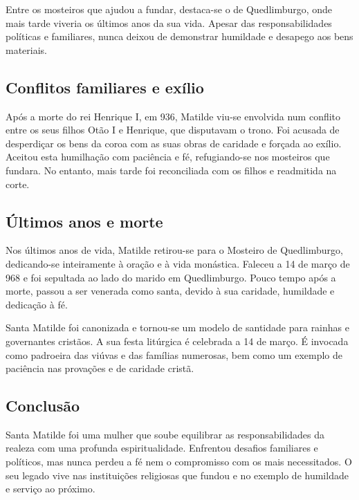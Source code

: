 \documentclass[a4paper,14pt]{extarticle} \usepackage[utf8]{inputenc}
\begin{document}
Entre os mosteiros que ajudou a fundar, destaca-se o de Quedlimburgo, onde mais tarde viveria os últimos anos da sua vida. Apesar das responsabilidades políticas e familiares, nunca deixou de demonstrar humildade e desapego aos bens materiais.

\subsection{Conflitos familiares e exílio}

Após a morte do rei Henrique I, em 936, Matilde viu-se envolvida num conflito entre os seus filhos Otão I e Henrique, que disputavam o trono. Foi acusada de desperdiçar os bens da coroa com as suas obras de caridade e forçada ao exílio. Aceitou esta humilhação com paciência e fé, refugiando-se nos mosteiros que fundara. No entanto, mais tarde foi reconciliada com os filhos e readmitida na corte.

\subsection{Últimos anos e morte}

Nos últimos anos de vida, Matilde retirou-se para o Mosteiro de Quedlimburgo, dedicando-se inteiramente à oração e à vida monástica. Faleceu a 14 de março de 968 e foi sepultada ao lado do marido em Quedlimburgo. Pouco tempo após a morte, passou a ser venerada como santa, devido à sua caridade, humildade e dedicação à fé.

Santa Matilde foi canonizada e tornou-se um modelo de santidade para rainhas e governantes cristãos. A sua festa litúrgica é celebrada a 14 de março. É invocada como padroeira das viúvas e das famílias numerosas, bem como um exemplo de paciência nas provações e de caridade cristã.

\subsection{Conclusão}

Santa Matilde foi uma mulher que soube equilibrar as responsabilidades da realeza com uma profunda espiritualidade. Enfrentou desafios familiares e políticos, mas nunca perdeu a fé nem o compromisso com os mais necessitados. O seu legado vive nas instituições religiosas que fundou e no exemplo de humildade e serviço ao próximo.

\newpage

\vfill
\end{document}
